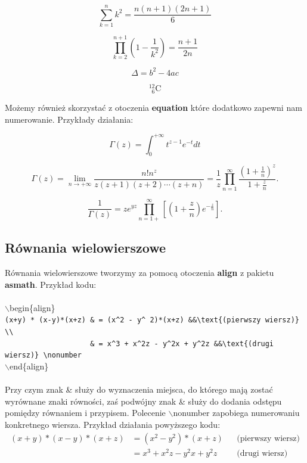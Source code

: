\documentclass[a4paper, 12pt]{article}
\begin{document}
\begin{displaymath}
\sum_{k=1}^{n}k^{2} = \frac{n(n + 1)(2n + 1)}{6}
\end{displaymath}

\begin{displaymath}
\prod_{k=2}^{n+1}\left( 1 - \frac{1}{k^{2}} \right) = \frac{n + 1}{2n}
\end{displaymath}

$$
\Delta = b^2 - 4ac
$$

$$
{}^{12}_{\phantom{1}6}\textrm{C}
$$

Możemy również skorzystać z otoczenia \textbf{equation} które dodatkowo zapewni nam numerowanie. Przykłady działania:

\begin{equation}
\Gamma (z) = \int_{0}^{+\infty} t^{z-1}e^{-t}dt
\end{equation}

\begin{equation}
\Gamma (z) = \lim_{n \rightarrow +\infty} \frac{n!n^z}{z(z + 1)(z + 2)\cdots(z + n)} = \frac{1}{z}\prod_{n=1}^{\infty} \frac{(1 + \frac{1}{n})^{z}}{1 + \frac{z}{n}}.
\end{equation}

\begin{equation}
\frac{1}{\Gamma(z)} = ze^{yz} \prod_{n=1+}^{\infty} \left[ \left( 1 + \frac{z}{n} \right) e^{-\frac{z}{n}} \right].
\end{equation}


\subsection{Równania wielowierszowe}
Równania wielowierszowe tworzymy za pomocą otoczenia \textbf{align} z pakietu \textbf{asmath}. Przykład kodu: \\
\\
$\backslash$begin\{align\}\\
	\verb|(x+y) * (x-y)*(x+z) & = (x^2 - y^ 2)*(x+z) &&\text{(pierwszy wiersz)} \\| \\
	\verb|                    & = x^3 + x^2z - y^2x + y^2z &&\text{(drugi wiersz)} \nonumber| \\
$\backslash$end\{align\}\\
\\
Przy czym znak \& służy do wyznaczenia miejsca, do którego mają zostać wyrównane znaki równości, zaś podwójny znak \& służy do dodania odstępu pomiędzy równaniem i przypisem. Polecenie $\backslash$nonumber zapobiega numerowaniu konkretnego wiersza. Przykład działania powyższego kodu:
\begin{align}
(x+y) * (x-y)*(x+z) & = (x^2 - y^ 2)*(x+z) &&\text{(pierwszy wiersz)} \\ 
                    & = x^3 + x^2z - y^2x + y^2z &&\text{(drugi wiersz)} \nonumber
\end{align}
\end{document}
